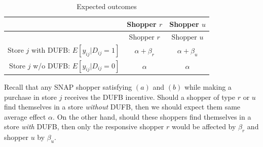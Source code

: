 \documentclass[12pt,letterpaperpaper,]{book}
\begin{document}
\begin{longtable}[]{@{}rcc@{}}
\caption{\label{tab:potential-outcomes} Expected outcomes}\tabularnewline
\toprule
\begin{minipage}[b]{0.48\columnwidth}\raggedleft\strut
\strut
\end{minipage} & \begin{minipage}[b]{0.23\columnwidth}\centering\strut
Shopper \(r\)\strut
\end{minipage} & \begin{minipage}[b]{0.20\columnwidth}\centering\strut
Shopper \(u\)\strut
\end{minipage}\tabularnewline
\midrule
\endfirsthead
\toprule
\begin{minipage}[b]{0.48\columnwidth}\raggedleft\strut
\strut
\end{minipage} & \begin{minipage}[b]{0.23\columnwidth}\centering\strut
Shopper \(r\)\strut
\end{minipage} & \begin{minipage}[b]{0.20\columnwidth}\centering\strut
Shopper \(u\)\strut
\end{minipage}\tabularnewline
\midrule
\endhead
\begin{minipage}[t]{0.48\columnwidth}\raggedleft\strut
Store \(j\) with DUFB: \(E[y_{ij} \vert D_{ij}=1]\)\strut
\end{minipage} & \begin{minipage}[t]{0.23\columnwidth}\centering\strut
\(\alpha + \beta_{r}\)\strut
\end{minipage} & \begin{minipage}[t]{0.20\columnwidth}\centering\strut
\(\alpha + \beta_u\)\strut
\end{minipage}\tabularnewline
\begin{minipage}[t]{0.48\columnwidth}\raggedleft\strut
Store \(j\) w/o DUFB: \(E[y_{ij} \vert D_{ij}=0]\)\strut
\end{minipage} & \begin{minipage}[t]{0.23\columnwidth}\centering\strut
\(\alpha\)\strut
\end{minipage} & \begin{minipage}[t]{0.20\columnwidth}\centering\strut
\(\alpha\)\strut
\end{minipage}\tabularnewline
\bottomrule
\end{longtable}

Recall that any SNAP shopper satisfying \((a)\) and \((b)\) while making
a purchase in store \(j\) receives the DUFB incentive. Should a shopper
of type \(r\) or \(u\) find themselves in a store \emph{without} DUFB,
then we should expect them same average effect \(\alpha\). On the other
hand, should these shoppers find themselves in a store \emph{with} DUFB,
then only the responsive shopper \(r\) would be affected by \(\beta_r\)
and shopper \(u\) by \(\beta_u\).
\end{document}
